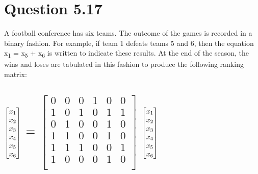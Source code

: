 \documentclass{report}
\begin{document}
    
    \section*{\hfil Question 5.17 \hfil}
    A football conference has six teams. The outcome of the games is recorded in a binary fashion. For example, if team 1 defeats teams 5 and 6, then the equation x\textsubscript{1} = 
    x\textsubscript{5} + x\textsubscript{6} is written to indicate these results. At the end of the season, the wins and loses are tabulated in this fashion to produce the following 
    ranking matrix: 
        
        \subsection*{$\begin{bmatrix}
            x\textsubscript{1}\\
            x\textsubscript{2}\\
            x\textsubscript{3}\\
            x\textsubscript{4}\\
            x\textsubscript{5}\\
            x\textsubscript{6}\\
        \end{bmatrix}$ = $\begin{bmatrix}
                0 & 0 & 0 & 1 & 0 & 0\\
                1 & 0 & 1 & 0 & 1 & 1\\
                0 & 1 & 0 & 0 & 1 & 0\\
                1 & 1 & 0 & 0 & 1 & 0\\
                1 & 1 & 1 & 0 & 0 & 1\\
                1 & 0 & 0 & 0 & 1 & 0\\
            \end{bmatrix}$ $\begin{bmatrix}
                x\textsubscript{1}\\
                x\textsubscript{2}\\
                x\textsubscript{3}\\
                x\textsubscript{4}\\
                x\textsubscript{5}\\
                x\textsubscript{6}\\
            \end{bmatrix}$}
        
\end{document}
